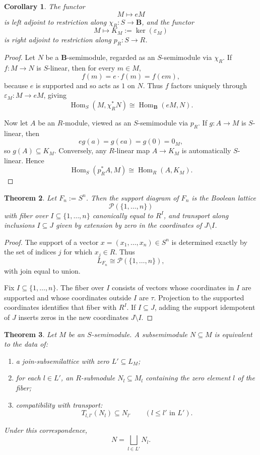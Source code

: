\documentclass[11pt]{amsart}
\numberwithin{equation}{section}
\newtheorem{theorem}{Theorem}[section]
\newtheorem{corollary}[theorem]{Corollary}
\theoremstyle{definition}
\newcommand{\B}{\mathbf B}
\newcommand{\Hom}{\operatorname{Hom}}
\newcommand{\cP}{\mathcal P}
\begin{document}
\begin{corollary}\label{cor:adjunctions}
The functor
\[
M\longmapsto eM
\]
is left adjoint to restriction along $\chi_R:S\to\B$, and the functor
\[
M\longmapsto K_M:=\ker(\varepsilon_M)
\]
is right adjoint to restriction along $p_R:S\to R$.
\end{corollary}

\begin{proof}
Let $N$ be a $\B$-semimodule, regarded as an $S$-semimodule via $\chi_R$. If $f:M\to N$ is $S$-linear, then for every $m\in M$,
\[
f(m)=e\cdot f(m)=f(em),
\]
because $e$ is supported and so acts as $1$ on $N$. Thus $f$ factors uniquely through $\varepsilon_M:M\to eM$, giving
\[
\Hom_S(M,\chi_R^*N)\cong \Hom_{\B}(eM,N).
\]

Now let $A$ be an $R$-module, viewed as an $S$-semimodule via $p_R$. If $g:A\to M$ is $S$-linear, then
\[
eg(a)=g(ea)=g(0)=0_M,
\]
so $g(A)\subseteq K_M$. Conversely, any $R$-linear map $A\to K_M$ is automatically $S$-linear. Hence
\[
\Hom_S(p_R^*A,M)\cong \Hom_R(A,K_M).
\]

\end{proof}

\begin{theorem}\label{thm:free-semimodule-boolean-cube}
Let $F_n:=S^n$. Then the support diagram of $F_n$ is the Boolean lattice
\[
\cP(\{1,\dots,n\})
\]
with fiber over $I\subseteq\{1,\dots,n\}$ canonically equal to $R^I$, and transport along inclusions $I\subseteq J$ given by extension by zero in the coordinates of $J\setminus I$.
\end{theorem}

\begin{proof}
The support of a vector $x=(x_1,\dots,x_n)\in S^n$ is determined exactly by the set of indices $j$ for which $x_j\in R$. Thus
\[
L_{F_n}\cong \cP(\{1,\dots,n\}),
\]
with join equal to union.

Fix $I\subseteq\{1,\dots,n\}$. The fiber over $I$ consists of vectors whose coordinates in $I$ are supported and whose coordinates outside $I$ are $\tau$. Projection to the supported coordinates identifies that fiber with $R^I$. If $I\subseteq J$, adding the support idempotent of $J$ inserts zeros in the new coordinates $J\setminus I$. 
\end{proof}

\begin{theorem}\label{thm:subsemimodule-classification}
Let $M$ be an $S$-semimodule. A subsemimodule $N\subseteq M$ is equivalent to the data of:
\begin{enumerate}[label=(\arabic*)]
    \item a join-subsemilattice with zero $L'\subseteq L_M$;
    \item for each $l\in L'$, an $R$-submodule $N_l\subseteq M_l$ containing the zero element $l$ of the fiber;
    \item compatibility with transport:
    \[
    T_{l,l'}(N_l)\subseteq N_{l'}
    \qquad(l\le l'\text{ in }L').
    \]
\end{enumerate}
Under this correspondence,
\[
N=\bigsqcup_{l\in L'}N_l.
\]
\end{theorem}
\end{document}
